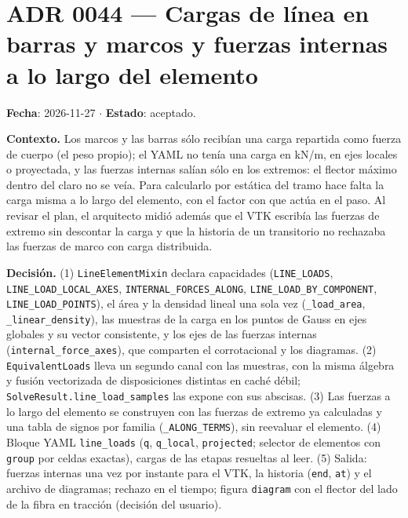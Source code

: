 \documentclass[11pt,oneside]{report}
\begin{document}
\section{ADR 0044 --- Cargas de línea en barras y marcos y fuerzas internas a lo largo del elemento}
\label{adr:0044}

\textbf{Fecha}: 2026-11-27 \ensuremath{\cdot} \textbf{Estado}: aceptado.

\textbf{Contexto.} Los marcos y las barras sólo recibían una carga repartida como fuerza de cuerpo (el peso propio); el YAML no tenía una carga en kN/m, en ejes locales o proyectada, y las fuerzas internas salían sólo en los extremos: el flector máximo dentro del claro no se veía. Para calcularlo por estática del tramo hace falta la carga misma a lo largo del elemento, con el factor con que actúa en el paso. Al revisar el plan, el arquitecto midió además que el VTK escribía las fuerzas de extremo sin descontar la carga y que la historia de un transitorio no rechazaba las fuerzas de marco con carga distribuida.

\textbf{Decisión.} (1) \texttt{LineElementMixin} declara capacidades (\texttt{LINE\_LOADS}, \texttt{LINE\_\allowbreak{}LOAD\_\allowbreak{}LOCAL\_\allowbreak{}AXES}, \texttt{INTERNAL\_\allowbreak{}FORCES\_\allowbreak{}ALONG}, \texttt{LINE\_\allowbreak{}LOAD\_\allowbreak{}BY\_\allowbreak{}COMPONENT}, \texttt{LINE\_LOAD\_POINTS}), el área y la densidad lineal una sola vez (\texttt{\_load\_area}, \texttt{\_linear\_density}), las muestras de la carga en los puntos de Gauss en ejes globales y su vector consistente, y los ejes de las fuerzas internas (\texttt{internal\_\allowbreak{}force\_\allowbreak{}axes}), que comparten el corrotacional y los diagramas. (2) \texttt{EquivalentLoads} lleva un segundo canal con las muestras, con la misma álgebra y fusión vectorizada de disposiciones distintas en caché débil; \texttt{SolveResult.\allowbreak{}line\_\allowbreak{}load\_\allowbreak{}samples} las expone con sus abscisas. (3) Las fuerzas a lo largo del elemento se construyen con las fuerzas de extremo ya calculadas y una tabla de signos por familia (\texttt{\_ALONG\_TERMS}), sin reevaluar el elemento. (4) Bloque YAML \texttt{line\_loads} (\texttt{q}, \texttt{q\_local}, \texttt{projected}; selector de elementos con \texttt{group} por celdas exactas), cargas de las etapas resueltas al leer. (5) Salida: fuerzas internas una vez por instante para el VTK, la historia (\texttt{end}, \texttt{at}) y el archivo de diagramas; rechazo en el tiempo; figura \texttt{diagram} con el flector del lado de la fibra en tracción (decisión del usuario).
\end{document}
